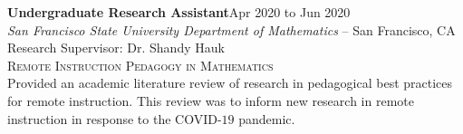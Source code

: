 \documentclass[hidelinks, 10pt]{article}
\begin{document}
{{    \vspace{4mm}

    \begin{minipage}[ct]{0.9\linewidth}
        \textbf{Undergraduate Research Assistant}\hfill Apr 2020 to Jun 2020\\
        \emph{San Francisco State University Department of Mathematics} -- San Francisco, CA\\
        Research Supervisor: Dr. Shandy Hauk\\
        {\textsc{Remote Instruction Pedagogy in Mathematics}}
        \vspace{1mm}\\
        Provided an academic literature review of research in pedagogical best practices
        for remote instruction.  This review was to inform new research in remote
        instruction in response to the COVID-$19$ pandemic.
    \end{minipage}

    \vspace{4mm}


}}
\end{document}
